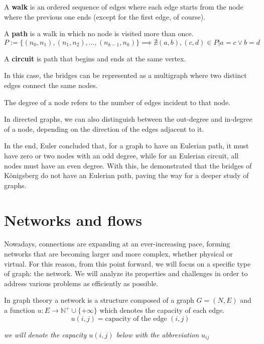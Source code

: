 \begin{definition}
    A \textbf{walk} is an ordered sequence of edges where each edge starts from the node where the previous one ends (except for the first edge, of course).

    A \textbf{path} is a walk in which no node is visited more than once.
    \[P := \{(n_0, n_1),(n_1, n_2), ..., (n_{k-1}, n_k) \}\implies \nexists (a,b), (c,d)\in P | a = c \lor b = d\]
    
    A \textbf{circuit} is path that begins and ends at the same vertex.

\end{definition}

    In this case, the bridges can be represented as a multigraph where two distinct edges connect the same nodes.

\begin{definition}
    The degree of a node refers to the number of edges incident to that node.  
    
    In directed graphs, we can also distinguish between the out-degree and in-degree of a node, depending on the direction of the edges adjacent to it.
\end{definition}

In the end, Euler concluded that, for a graph to have an Eulerian path, it must have zero or two nodes with an odd degree, while for an Eulerian circuit, all nodes must have an even degree. With this, he demonstrated that the bridges of Königsberg do not have an Eulerian path, paving the way for a deeper study of graphs.
\newpage
\section{Networks and flows}  
Nowadays, connections are expanding at an ever-increasing pace, forming networks that are becoming larger and more complex, whether physical or virtual. For this reason, from this point forward, we will focus on a specific type of graph: the network. We will analyze its properties and challenges in order to address various problems as efficiently as possible.
\begin{definition}[Network]
    In graph theory a network is a structure composed of a graph $G = (N,E)$ and a function $u: E \rightarrow \mathbb{N}^+\cup \{+\infty\}$ which denotes the capacity of each edge.
    \[u(i,j) = \text{capacity of the edge } (i,j)\]
    \begin{center}
        \textit{we will denote the capacity $u(i,j)$ below with the abbreviation $u_{ij}$}
    \end{center}
\end{definition}

